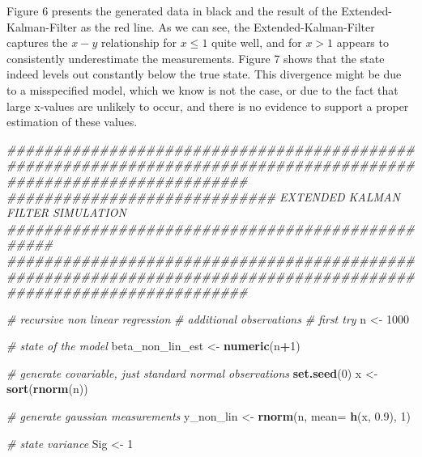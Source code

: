 \documentclass[
]{article}
\newenvironment{Shaded}{\begin{snugshade}}{\end{snugshade}}
\newcommand{\CommentTok}[1]{\textcolor[rgb]{0.56,0.35,0.01}{\textit{#1}}}
\newcommand{\DataTypeTok}[1]{\textcolor[rgb]{0.13,0.29,0.53}{#1}}
\newcommand{\DecValTok}[1]{\textcolor[rgb]{0.00,0.00,0.81}{#1}}
\newcommand{\FloatTok}[1]{\textcolor[rgb]{0.00,0.00,0.81}{#1}}
\newcommand{\KeywordTok}[1]{\textcolor[rgb]{0.13,0.29,0.53}{\textbf{#1}}}
\newcommand{\NormalTok}[1]{#1}
\newcommand{\OperatorTok}[1]{\textcolor[rgb]{0.81,0.36,0.00}{\textbf{#1}}}
\newcommand{\StringTok}[1]{\textcolor[rgb]{0.31,0.60,0.02}{#1}}
\begin{document}
Figure 6 presents the generated data in black and the result of the
Extended-Kalman-Filter as the red line. As we can see, the
Extended-Kalman-Filter captures the \(x-y\) relationship for
\(x \leq 1\) quite well, and for \(x > 1\) appears to consistently
underestimate the measurements. Figure 7 shows that the state indeed
levels out constantly below the true state. This divergence might be due
to a misspecified model, which we know is not the case, or due to the
fact that large x-values are unlikely to occur, and there is no evidence
to support a proper estimation of these values.

\begin{Shaded}
\begin{Highlighting}[]
\CommentTok{##################################################################################################################}
\CommentTok{############################# EXTENDED KALMAN FILTER SIMULATION  #################################################}
\CommentTok{##################################################################################################################}

\CommentTok{# recursive non linear regression}
\CommentTok{# additional observations}
\CommentTok{# first try}
\NormalTok{n <-}\StringTok{ }\DecValTok{1000}

\CommentTok{# state of the model}
\NormalTok{beta_non_lin_est  <-}\StringTok{ }\KeywordTok{numeric}\NormalTok{(n}\OperatorTok{+}\DecValTok{1}\NormalTok{)}

\CommentTok{# generate covariable, just standard normal observations }
\KeywordTok{set.seed}\NormalTok{(}\DecValTok{0}\NormalTok{)}
\NormalTok{x  <-}\StringTok{ }\KeywordTok{sort}\NormalTok{(}\KeywordTok{rnorm}\NormalTok{(n))}

\CommentTok{# generate gaussian measurements}
\NormalTok{y_non_lin <-}\StringTok{ }\KeywordTok{rnorm}\NormalTok{(n, }\DataTypeTok{mean=} \KeywordTok{h}\NormalTok{(x, }\FloatTok{0.9}\NormalTok{), }\DecValTok{1}\NormalTok{)}

\CommentTok{# state variance }
\NormalTok{Sig <-}\StringTok{ }\DecValTok{1}


\end{Highlighting}
\end{Shaded}
\end{document}
